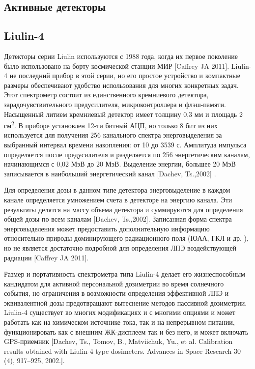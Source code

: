 \documentclass[a4paper,portrait,12pt]{article}
\begin{document}
{{{{\subsection*{	\textbf{Активные детекторы}}

\subsection*{	\textbf{Liulin-4}}

Детекторы серии Liulin используются с 1988 года, когда их первое поколение было использовано на борту космической станции МИР [Caffrey JA 2011]. Liulin-4 не последний прибор в этой серии, но его простое устройство и компактные размеры обеспечивают удобство использования для многих конкретных задач. Этот спектрометр состоит из единственного кремниевого детектора, зарадочувствительного предусилителя, микроконтроллера и флэш-памяти. Насыщенный литием кремниевый детектор имеет толщину 0,3 мм и площадь 2 см\textsuperscript{2}. В приборе установлен 12-ти битный АЦП, но только 8 бит из них используется для получения 256 канального спектра энерговыделения за выбранный интервал времени накопления: от 10 до 3539 с. Амплитуда импульса определяется после предусилителя и разделяется по 256 энергетическим каналам, начинающимся с 0,02 МэВ до 20 МэВ. Выделение энергии, большее 20 МэВ записывается в наибольший энергетический канал [Dachev, Ts.,2002] .


Для определения дозы в данном типе детектора энерговыделение в каждом канале определяется умножением счета в детекторе на энергию канала. Эти результаты делятся на массу объема детектора и суммируются для определения общей дозы по всем каналам [Dachev, Ts.,2002]. Записанная форма спектра энерговыделения может предоставить дополнительную информацию относительно природы доминирующего радиационного поля (ЮАА, ГКЛ и др. ), но не является достаточно подробной для определения ЛПЭ воздействующей радиации [Caffrey JA 2011]. 


Размер и портативность спектрометра типа Liulin-4 делает его жизнеспособным кандидатом для активной персональной дозиметрии во время солнечного события, но ограничения в возможности определения эффективной ЛПЭ и эквивалентной дозы предотвращают вытеснение методов пассивной дозиметрии. Liulin-4 существует во многих модификациях и с многими опциями и может работать как на химическом источнике тока, так и на непрерывном питании, функционировать как с внешним ЖК-дисплеем так и без него, и может включать GPS-приемник [Dachev, Ts., Tomov, B., Matviichuk, Yu., et al. Calibration results obtained with Liulin-4 type dosimeters. Advances in Space Research 30 (4), 917--925, 2002.].	


}}}}
\end{document}
